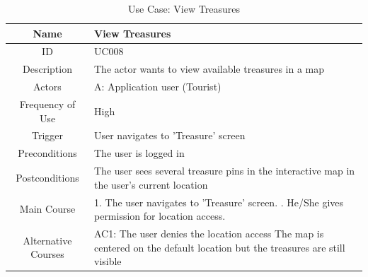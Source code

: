 \documentclass[12pt, a4paper, oneside]{article}
\begin{document}
\begin{table}[H]
\begin{tabularx}{\linewidth}{|c|X|}
\hline
Name                & View Treasures                                                                                                                                                                                                                      \\ \hline
ID                  & UC008                                                                                                                                                                                                                       \\ \hline
Description         & The actor wants to view available treasures in a map                                                                                                                                                   \\ \hline
Actors              & A: Application user (Tourist)                                                                                                                                                                                                 \\ \hline
Frequency of Use    & High                                                                                                                                                                                                                    \\ \hline
Trigger             & User navigates to 'Treasure' screen                                                                                                                                                                                           \\ \hline
Preconditions       & The user is logged in                                                                                                                                                                                                                          \\ \hline
Postconditions      & The user sees several treasure pins in the interactive map in the user's current location                                                                                                                                      \\ \hline
Main Course         & 1. The user navigates to 'Treasure' screen. \newline 2. He/She gives permission for location access. \\ \hline
Alternative Courses & AC1: The user denies the location access \newline The map is centered on the default location but the treasures are still visible                                                                                            \\ \hline
\end{tabularx}
\caption{Use Case: View Treasures}
\label{uc-view-treasures}
\end{table}
\end{document}
